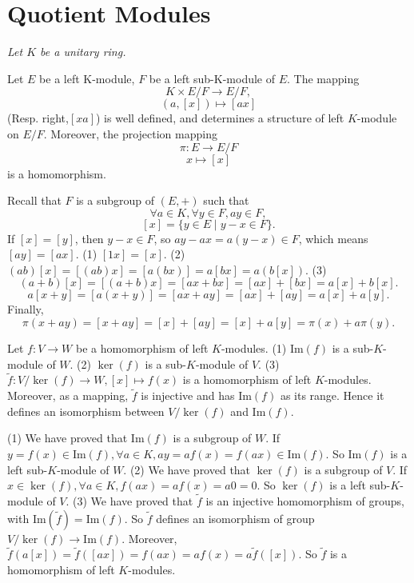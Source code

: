 \documentclass{book}
\numberwithin{equation}{section}
\begin{document}
\section{Quotient Modules}
\textit{Let $K$ be a unitary ring.}
\begin{propositionenv}
    Let $E$ be a left K-module, $F$ be a left sub-K-module of $E$. The mapping
    $$K\times E/ F\longrightarrow E/ F,$$
    $$(a,[x])\longmapsto [ax]$$
    (Resp. right,$[xa]$) is well defined, and determines a structure of left $K$-module on $E/ F$. Moreover, the projection mapping
    $$\pi:E\longrightarrow E/ F$$
    $$x\longmapsto [x]$$
    is a homomorphism.
\end{propositionenv}
\begin{proofenv}
    Recall that $F$ is a subgroup of $(E,+)$ such that 
    $$\forall a\in K, \forall y\in F, ay\in F,$$
    $$[x]=\{y\in E\mid y-x\in F\}.$$
    If $[x]=[y]$, then $y-x\in F$, so $ay-ax=a(y-x)\in F$, which means $[ay]=[ax]$.
    \newline
    (1) $[1x]=[x]$.
    \newline
    (2) $(ab)[x]=[(ab)x]=[a(bx)]=a[bx]=a(b[x])$.
    \newline
    (3) $$(a+b)[x]=[(a+b)x]=[ax+bx]=[ax]+[bx]=a[x]+b[x].$$
    $$a[x+y]=[a(x+y)]=[ax+ay]=[ax]+[ay]=a[x]+a[y].$$
    Finally,
    $$\pi(x+ay)=[x+ay]=[x]+[ay]=[x]+a[y]=\pi(x)+a\pi(y).$$
\end{proofenv}
\begin{theoremenv}
    Let $f:V\rightarrow W$ be a homomorphism of left $K$-modules.
    \newline
    (1) $\mathrm{Im}(f)$ is a sub-$K$-module of $W$.
    \newline
    (2) $\ker(f)$ is a sub-$K$-module of $V$.
    \newline
    (3) $\tilde{f}:V/\ker(f)\longrightarrow W,[x]\longmapsto f(x)$ is a homomorphism of left $K$-modules. Moreover, as a mapping, $\tilde{f}$ is injective and has $\mathrm{Im}(f)$ as its range. Hence it defines an isomorphism between $V/\ker(f)$ and $\mathrm{Im}(f)$.
\end{theoremenv}
\begin{proofenv}
    \quad
    \newline
    (1) We have proved that $\mathrm{Im}(f)$ is a subgroup of $W$. If $y=f(x)\in \mathrm{Im}(f), \forall a\in K, ay=af(x)=f(ax)\in \mathrm{Im}(f)$. So $\mathrm{Im}(f)$ is a left sub-$K$-module of $W$.
    \newline
    (2) We have proved that $\ker(f)$ is a subgroup of $V$. If $x\in \ker(f), \forall a\in K, f(ax)=af(x)=a0=0$. So $\ker(f)$ is a left sub-$K$-module of $V$.
    \newline
    (3) We have proved that $\tilde{f}$ is an injective homomorphism of groups, with $\mathrm{Im}(\tilde{f})=\mathrm{Im}(f)$. So $\tilde{f}$ defines an isomorphism of group $V/\ker(f)\longrightarrow \mathrm{Im}(f)$. Moreover, $\tilde{f}(a[x])=\tilde{f}([ax])=f(ax)=af(x)=a\tilde{f}([x])$. So $\tilde{f}$ is a homomorphism of left $K$-modules.
\end{proofenv}
\end{document}
